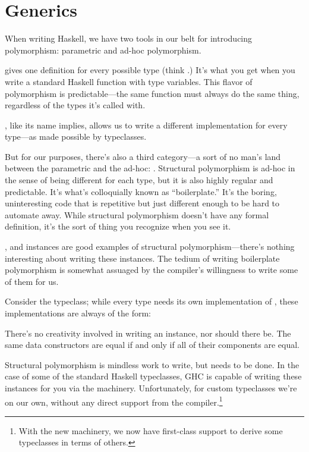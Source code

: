 \documentclass[book.tex]{subfiles}
\begin{document}
\chapter{Generics}

When writing Haskell, we have two tools in our belt for introducing
polymorphism: parametric and ad-hoc polymorphism.

 gives one definition
for every possible type (think .) It's what you get when
you write a standard Haskell function with type variables. This flavor of
polymorphism is predictable---the same function must always do the same thing,
regardless of the types it's called with.

, like its name implies, allows
us to write a different implementation for every type---as made possible by
typeclasses.

But for our purposes, there's also a third category---a sort of no man's land
between the parametric and the ad-hoc: .
Structural polymorphism is ad-hoc in the sense of being different for each type,
but it is also highly regular and predictable. It's what's colloquially known as
``boilerplate.'' It's the boring, uninteresting code that is repetitive but just
different enough to be hard to automate away. While structural polymorphism
doesn't have any formal definition, it's the sort of thing you recognize when
you see it.

,  and  instances are good examples of structural
polymorphism---there's nothing interesting about writing these instances. The
tedium of writing boilerplate polymorphism is somewhat assuaged by the
compiler's willingness to write some of them for us.

Consider the  typeclass; while every type needs its own implementation of
\hs{(==)}, these implementations are always of the form:


There's no creativity involved in writing an  instance, nor should there
be. The same data constructors are equal if and only if all of their components
are equal.

Structural polymorphism is mindless work to write, but needs to be done. In the
case of some of the standard Haskell typeclasses, GHC is capable of writing
these instances for you via the  machinery. Unfortunately, for
custom typeclasses we're on our own, without any direct support from the
compiler.\footnote{With the new  machinery, we now have
first-class support to derive some typeclasses in terms of others.}
\end{document}
